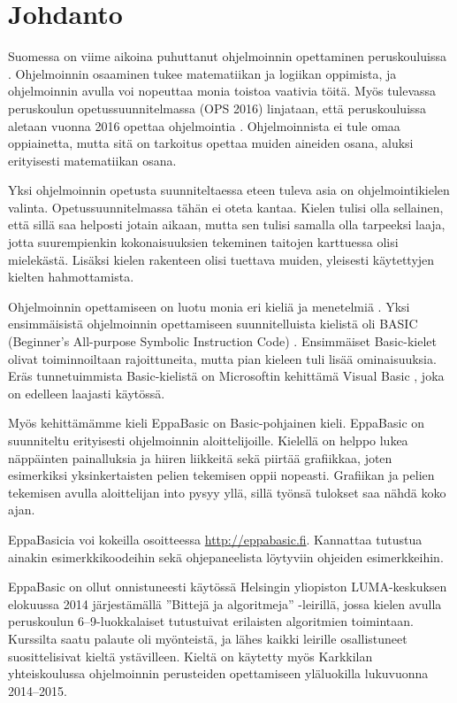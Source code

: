
\section{Johdanto}
Suomessa on viime aikoina
puhuttanut ohjelmoinnin
opettaminen peruskouluissa
\cite{hs_kiuru}\cite{hs_eka}.
Ohjelmoinnin osaaminen
tukee matematiikan ja logiikan
oppimista, ja ohjelmoinnin
avulla voi nopeuttaa monia
toistoa vaativia töitä.
Myös tulevassa peruskoulun
opetussuunnitelmassa (OPS 2016)
linjataan, että peruskouluissa aletaan
vuonna 2016 opettaa ohjelmointia
\cite{OPS_2016}.
Ohjelmoinnista ei tule omaa oppiainetta,
mutta sitä on tarkoitus opettaa muiden
aineiden osana, aluksi erityisesti
matematiikan osana.

Yksi ohjelmoinnin opetusta suunniteltaessa eteen tuleva
asia on ohjelmointikielen valinta.
Opetussuunnitelmassa tähän ei
oteta kantaa.
Kielen tulisi olla sellainen,
että sillä saa helposti jotain aikaan,
mutta sen tulisi samalla olla tarpeeksi laaja,
jotta suurempienkin kokonaisuuksien tekeminen
taitojen karttuessa olisi mielekästä.
Lisäksi kielen rakenteen olisi tuettava muiden,
yleisesti käytettyjen kielten hahmottamista.

Ohjelmoinnin opettamiseen
on luotu monia eri kieliä ja menetelmiä
\cite{language_history}.
Yksi ensimmäisistä ohjelmoinnin opettamiseen
suunnitelluista kielistä oli BASIC
(Beginner's All-purpose Symbolic Instruction Code)
\cite{basic}.
Ensimmäiset Basic-kielet olivat toiminnoiltaan rajoittuneita,
mutta pian kieleen tuli lisää ominaisuuksia.
Eräs tunnetuimmista Basic-kielistä on
Microsoftin kehittämä Visual Basic
\cite{vb.net},
joka on edelleen laajasti käytössä.

Myös kehittämämme kieli EppaBasic
on Basic-pohjainen kieli.
EppaBasic on suunniteltu
erityisesti ohjelmoinnin aloittelijoille.
Kielellä on helppo lukea
näppäinten painalluksia
ja hiiren liikkeitä
sekä piirtää grafiikkaa,
joten esimerkiksi yksinkertaisten
pelien tekemisen oppii nopeasti.
Grafiikan ja pelien tekemisen avulla
aloittelijan into pysyy yllä,
sillä työnsä tulokset saa nähdä koko ajan.

EppaBasicia voi kokeilla osoitteessa
\url{http://eppabasic.fi}.
Kannattaa tutustua ainakin esimerkkikoodeihin
sekä ohjepaneelista löytyviin
ohjeiden esimerkkeihin.

EppaBasic on ollut onnistuneesti käytössä
Helsingin yliopiston LUMA-keskuksen elokuussa 2014
järjestämällä ''Bittejä ja algoritmeja'' -leirillä,
jossa kielen avulla peruskoulun
6--9-luokkalaiset
tutustuivat erilaisten algoritmien toimintaan.
Kurssilta saatu palaute oli myönteistä,
ja lähes kaikki leirille osallistuneet
suosittelisivat kieltä ystävilleen.
Kieltä on käytetty myös Karkkilan yhteiskoulussa
ohjelmoinnin perusteiden opettamiseen yläluokilla
lukuvuonna 2014--2015.

